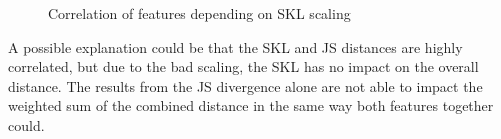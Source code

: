 \begin{figure}[htbp]
	\centering
	\caption{Correlation of features depending on SKL scaling}
	\label{fig:sklsc}
\end{figure}
\FloatBarrier

\noindent A possible explanation could be that the SKL and JS distances are highly correlated, but due to the bad scaling, the SKL has no impact on the overall distance. The results from the JS divergence alone are not able to impact the weighted sum of the combined distance in the same way both features together could. 


